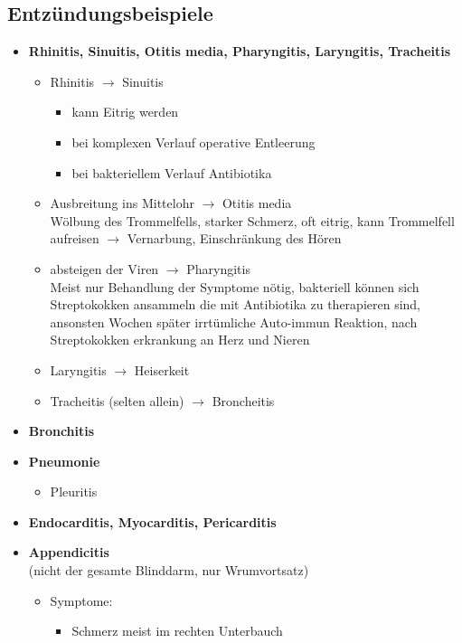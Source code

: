 	\subsection{Entzündungsbeispiele}
		\begin{itemize}
			\item \textbf{Rhinitis, Sinuitis, Otitis media, Pharyngitis, Laryngitis, Tracheitis}
				\begin{itemize}
					\item Rhinitis $\rightarrow$ Sinuitis
						\begin{itemize}
							\item kann Eitrig werden
							\item bei komplexen Verlauf operative Entleerung
							\item bei bakteriellem Verlauf Antibiotika
						\end{itemize}
					\item Ausbreitung ins Mittelohr $\rightarrow$ Otitis media\\
						Wölbung des Trommelfells, starker Schmerz, oft eitrig, kann Trommelfell aufreisen $\rightarrow$ Vernarbung, Einschränkung des Hören
					\item absteigen der Viren $\rightarrow$ Pharyngitis\\
						Meist nur Behandlung der Symptome nötig, bakteriell können sich Streptokokken ansammeln die mit Antibiotika zu therapieren sind, ansonsten Wochen später irrtümliche Auto-immun Reaktion, nach Streptokokken erkrankung an Herz und Nieren
					\item Laryngitis $\rightarrow$ Heiserkeit
					\item Tracheitis (selten allein) $\rightarrow$ Broncheitis
				\end{itemize}
			\item \textbf{Bronchitis}
			\item \textbf{Pneumonie}
				\begin{itemize}
					\item Pleuritis
				\end{itemize}
			\item \textbf{Endocarditis, Myocarditis, Pericarditis}
			\item \textbf{Appendicitis}\\
				(nicht der gesamte Blinddarm, nur Wrumvortsatz)
				\begin{itemize}
					\item Symptome:
						\begin{itemize}
						 	\item Schmerz meist im rechten Unterbauch

\end{itemize}
\end{itemize}
\end{itemize}
